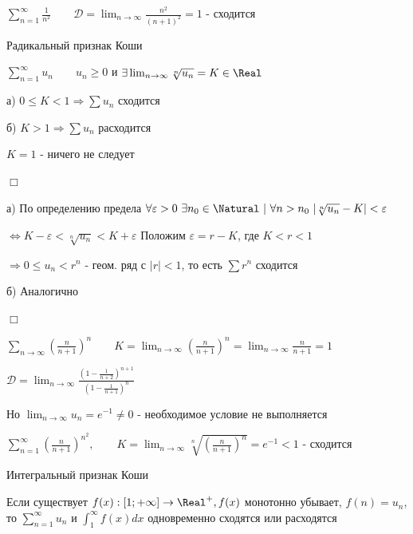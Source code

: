 \documentclass[12pt]{article}
\begin{document}
    $\sum_{n = 1}^\infty \frac{1}{n^2} \quad\quad \mathcal{D} = \lim_{n \to \infty} \frac{n^2}{(n + 1)^2} = 1$ - сходится

    \hypertarget{cauchyradicalsign}{}

    \begin{MyTheorem}
         Радикальный признак Коши

        $\sum_{n = 1}^\infty u_n \quad\quad u_n \geq 0$ и $\exists \lim_{n \to \infty} \sqrt[n]{u_n} = K \in \Real$

        а) $0 \leq K < 1 \Longrightarrow \sum u_n$ сходится

        б) $K > 1 \Longrightarrow \sum u_n$ расходится
    \end{MyTheorem}

    \Notas $K = 1$ - ничего не следует

    \begin{MyProof}
        $\Box$

        а) По определению предела $\forall \varepsilon > 0 \ \exists n_0 \in \Natural \ | \ \forall n > n_0 \ |\sqrt[n]{u_n} - K| < \varepsilon$

        $\Longleftrightarrow K - \varepsilon < \sqrt[n]{u_n} < K + \varepsilon$ Положим $\varepsilon = r - K$, где $K < r < 1$

        $\Longrightarrow 0 \leq u_n < r^n$ - геом. ряд с $|r| < 1$, то есть $\sum r^n$ сходится

        б) Аналогично

        $\Box$
    \end{MyProof}

     $\sum_{n \to \infty} \left(\frac{n}{n + 1}\right)^n \quad\quad K = \lim_{n \to \infty} \left(\frac{n}{n + 1}\right)^n = \lim_{n \to \infty} \frac{n}{n + 1} = 1$

    $\mathcal{D} = \lim_{n \to \infty} \frac{\left(1 - \frac{1}{n + 2}\right)^{n + 1}}{\left(1 - \frac{1}{n + 1}\right)^{n}}$

    Но $\lim_{n \to \infty} u_n = e^{-1} \neq 0$ - необходимое условие не выполняется

     $\sum_{n = 1}^\infty \left(\frac{n}{n + 1}\right)^{n^2}, \quad\quad K = \lim_{n \to \infty} \sqrt[n]{\left(\frac{n}{n + 1}\right)^n} = e^{-1} < 1$ - сходится

    \hypertarget{cauchyintegralsign}{}

    \begin{MyTheorem}
         Интегральный признак Коши

        Если существует $f(x) : [1; +\infty] \to \Real^+, f(x)$ монотонно убывает, $f(n) = u_n$, то $\sum_{n = 1}^\infty u_n$ и $\int_{1}^\infty f(x) dx$ одновременно сходятся или расходятся
    \end{MyTheorem}
\end{document}
